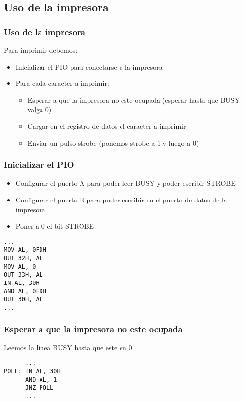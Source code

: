 \documentclass{beamer}
\begin{document}
\subsection{Uso de la impresora}
\begin{frame}
\frametitle{Uso de la impresora}
Para imprimir debemos:
\begin{itemize}
    \item Inicializar el PIO para conectarse a la impresora
    \item Para cada caracter a imprimir:
\begin{itemize}
    \item Esperar a que la impresora no este ocupada (esperar hasta que BUSY valga 0)
    \item Cargar en el registro de datos el caracter a imprimir
    \item Enviar un pulso strobe (ponemos strobe a 1 y luego a 0)
\end{itemize}
\end{itemize}
\end{frame}

\begin{frame}[fragile]
\frametitle{Inicializar el PIO}
\begin{itemize}
    \item Configurar el puerto A para poder leer BUSY y poder escribir STROBE
    \item Configurar el puerto B para poder escribir en el puerto de datos de la impresora
    \item Poner a 0 el bit STROBE
\end{itemize}
\begin{block}{}
\begin{verbatim}
...
MOV AL, 0FDH
OUT 32H, AL
MOV AL, 0
OUT 33H, AL
IN AL, 30H
AND AL, 0FDH
OUT 30H, AL
...
\end{verbatim}
\end{block}

\end{frame}

\begin{frame}[fragile]
\frametitle{Esperar a que la impresora no este ocupada}
Leemos la linea BUSY hasta que este en 0
\begin{block}{}
\begin{verbatim}
      ...
POLL: IN AL, 30H
      AND AL, 1
      JNZ POLL
      ...
\end{verbatim}
\end{block}
\end{frame}
\end{document}

